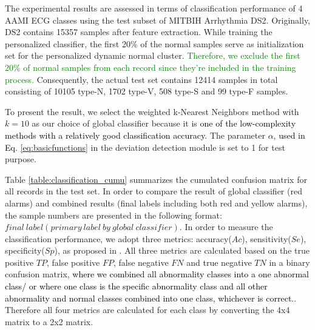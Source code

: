 The experimental results are assessed in terms of classification performance of 4 AAMI ECG classes using the test subset of MITBIH Arrhythmia DS2. Originally, DS2 contains 15357 samples after feature extraction. While training the personalized classifier, the first 20\% of the normal samples serve as initialization set for the personalized dynamic normal cluster. \textcolor{green}{Therefore, we exclude the first 20\% of normal samples from each record since they're included in the training process.} Consequently, the actual test set contains 12414 samples in total consisting of 10105 type-N, 1702 type-V, 508 type-S and 99 type-F samples.

To present the result, we select the weighted k-Nearest Neighbors method with $k=10$ as our choice of global classifier because it is \textcolor{black}{one of the low-complexity methods with a relatively good classification accuracy\cite{hechenbichler2004weighted}.}%
The parameter $\alpha$, \textcolor{black}{used in Eq. \ref{eq:basicfunctions}} in the deviation detection module is set to 1 for test purpose. 


Table \ref{table:classification_cumu} summarizes the cumulated confusion matrix for all records in the test set. In order to compare the result of global classifier (red alarms) and combined results (final labels including both red and yellow alarms), the sample numbers are presented in the following format: $final~label(primary~label~by~global~ classifier)$. In order to measure the classification performance, we adopt three metrics: accuracy($Ac$), sensitivity($Se$), specificity($Sp$), as proposed in \cite{Hu_et_al,deChazal2006,ince2009generic}. All three metrics are calculated based on the true positive $TP$, false positive $FP$, false negative $FN$ and true negative $TN$ in a binary confusion matrix, \textcolor{black}{where we combined all abnormality classes into a one abnormal class/ or where one class is the specific abnormality class and all other abnormality and normal classes combined into one class, whichever is correct.}. Therefore all four metrics are calculated for each class by converting the 4x4 matrix to a 2x2 matrix.

